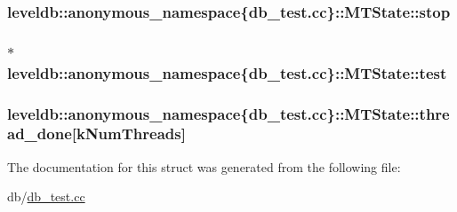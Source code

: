 \subsubsection[{stop}]{ leveldb\+::anonymous\+\_\+namespace\{db\+\_\+test.\+cc\}\+::M\+T\+State\+::stop}\label{structleveldb_1_1anonymous__namespace_02db__test_8cc_03_1_1_m_t_state_a367c0e9f6132e934914946929461432f}
\hypertarget{structleveldb_1_1anonymous__namespace_02db__test_8cc_03_1_1_m_t_state_aef289dafc9372f2abb0adfb8476b008e}{}
\subsubsection[{test}]{$\ast$ leveldb\+::anonymous\+\_\+namespace\{db\+\_\+test.\+cc\}\+::M\+T\+State\+::test}\label{structleveldb_1_1anonymous__namespace_02db__test_8cc_03_1_1_m_t_state_aef289dafc9372f2abb0adfb8476b008e}
\hypertarget{structleveldb_1_1anonymous__namespace_02db__test_8cc_03_1_1_m_t_state_a63eaf5722fbff3553a2cc2a494fbe039}{}
\subsubsection[{thread\+\_\+done}]{ leveldb\+::anonymous\+\_\+namespace\{db\+\_\+test.\+cc\}\+::M\+T\+State\+::thread\+\_\+done\mbox{[}{\bf k\+Num\+Threads}\mbox{]}}\label{structleveldb_1_1anonymous__namespace_02db__test_8cc_03_1_1_m_t_state_a63eaf5722fbff3553a2cc2a494fbe039}


The documentation for this struct was generated from the following file\+:\begin{DoxyCompactItemize}
\item 
db/\hyperlink{db__test_8cc}{db\+\_\+test.\+cc}\end{DoxyCompactItemize}
